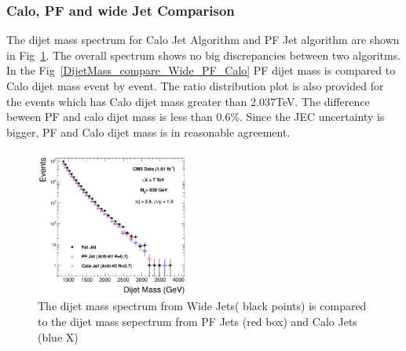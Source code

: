 \subsubsection{Calo, PF and wide Jet Comparison}

The dijet mass spectrum for Calo Jet Algorithm and PF Jet algorithm are shown
in Fig~\ref{DijetMass_for_Wide_PF_and_Calo}. The overall spectrum shows no big discrepancies
between two algoritms. In the Fig~\ref{DijetMass_compare_Wide_PF_Calo} PF dijet mass is
compared to Calo dijet mass event by event. The ratio distribution plot is also provided
for the events which has Calo dijet mass greater than 2.037TeV. The difference beween PF
and calo dijet mass is less than 0.6\%. Since the JEC uncertainty is bigger, PF and Calo
dijet mass is in reasonable agreement.

\begin{figure}[!ht]
  \begin{center}
   \includegraphics[width=0.45\textwidth]{Figures/c_DijetMass_calo_pf_fat_log.pdf}
    \caption{ The dijet mass spectrum from Wide Jets( black points) is compared to the dijet mass sepectrum from PF Jets (red box) and Calo Jets (blue X) }
    \label{DijetMass_for_Wide_PF_and_Calo}
  \end{center}
\end{figure}


